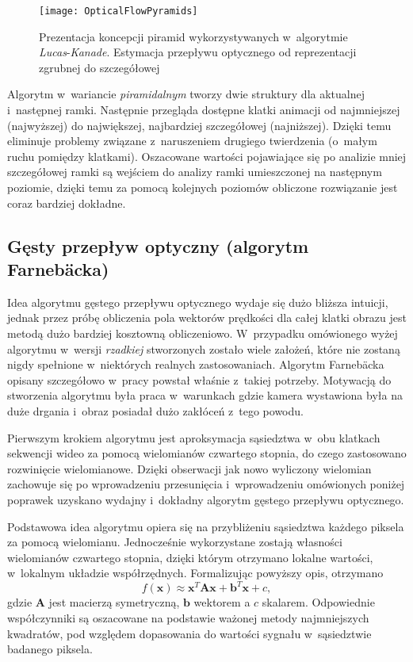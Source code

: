     \begin{figure}[!ht]
      \centering
      \texttt{[image: OpticalFlowPyramids]}
      \caption[Prezentacja koncepcji piramid wykorzystywanych w~algorytmie \textit{Lucas}-\textit{Kanade}]{Prezentacja koncepcji piramid wykorzystywanych w~algorytmie \textit{Lucas}-\textit{Kanade}. Estymacja przepływu optycznego od reprezentacji zgrubnej do szczegółowej}
      \label{fig:OpticalFlowPyramids}
    \end{figure}

    Algorytm w~wariancie \textit{piramidalnym} tworzy dwie struktury dla aktualnej i~następnej ramki. Następnie przegląda dostępne klatki animacji od najmniejszej (najwyższej) do największej, najbardziej szczegółowej (najniższej). Dzięki temu eliminuje problemy związane z~naruszeniem drugiego twierdzenia (o~małym ruchu pomiędzy klatkami). Oszacowane wartości pojawiające się po analizie mniej szczegółowej ramki są wejściem do analizy ramki umieszczonej na następnym poziomie, dzięki temu za pomocą kolejnych poziomów obliczone rozwiązanie jest coraz bardziej dokładne.

    \subsection{Gęsty przepływ optyczny (algorytm Farnebäcka)}\label{Subsection_DenseOpticalFlow}
    Idea algorytmu gęstego przepływu optycznego wydaje się dużo bliższa intuicji, jednak przez próbę obliczenia pola wektorów prędkości dla całej klatki obrazu jest metodą dużo bardziej kosztowną obliczeniowo. W~przypadku omówionego wyżej algorytmu w~wersji \textit{rzadkiej} stworzonych zostało wiele założeń, które nie zostaną nigdy spełnione w~niektórych realnych zastosowaniach. Algorytm Farnebäcka opisany szczegółowo w~pracy \cite{GunnarFarneback03} powstał właśnie z~takiej potrzeby. Motywacją do stworzenia algorytmu była praca w~warunkach gdzie kamera wystawiona była na duże drgania i~obraz posiadał dużo zakłóceń z~tego powodu.

    Pierwszym krokiem algorytmu jest aproksymacja sąsiedztwa w~obu klatkach sekwencji wideo za pomocą wielomianów czwartego stopnia, do czego zastosowano rozwinięcie wielomianowe. Dzięki obserwacji jak nowo wyliczony wielomian zachowuje się po wprowadzeniu przesunięcia i~wprowadzeniu omówionych poniżej poprawek uzyskano wydajny i~dokładny algorytm gęstego przepływu optycznego.

    Podstawowa idea algorytmu opiera się na przybliżeniu sąsiedztwa każdego piksela za pomocą wielomianu. Jednocześnie wykorzystane zostają własności wielomianów czwartego stopnia, dzięki którym otrzymano lokalne wartości, w~lokalnym układzie współrzędnych. Formalizując powyższy opis, otrzymano \[ f(\mathbf{x}) \approx \mathbf{x}^{T}\mathbf{A}\mathbf{x} + \mathbf{b}^{T}\mathbf{x} + c, \] gdzie $\mathbf{A}$ jest macierzą symetryczną, $\mathbf{b}$ wektorem a $c$ skalarem. Odpowiednie współczynniki są oszacowane na podstawie ważonej metody najmniejszych kwadratów, pod względem dopasowania do wartości sygnału w~sąsiedztwie badanego piksela.

